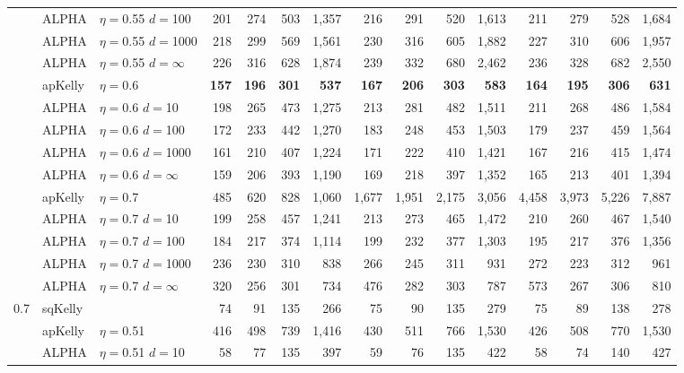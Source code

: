 \documentclass[12pt,runningheads]{llncs}
\begin{document}
{\begin{table}
\begin{tabular}{lll|rrrr|rrrr|rrrr}
& ALPHA & $\eta=$0.55 $d=$100 & 201  & 274  & 503  & 1,357  & 216  & 291  & 520  & 1,613  & 211  & 279  & 528  & 1,684  \\
& ALPHA & $\eta=$0.55 $d=$1000 & 218  & 299  & 569  & 1,561  & 230  & 316  & 605  & 1,882  & 227  & 310  & 606  & 1,957  \\
 & ALPHA & $\eta=$0.55 $d=\infty$ & 226  & 316  & 628  & 1,874  & 239  & 332  & 680  & 2,462  & 236  & 328  & 682  & 2,550  \\
\cline{2-15} & apKelly & $\eta=$0.6 & \bf{157}  & \bf{196}  & \bf{301}  & \bf{537}  & \bf{167}  & \bf{206}  & \bf{303}  & \bf{583}  & \bf{164}  & \bf{195}  & \bf{306}  & \bf{631}  \\
& ALPHA & $\eta=$0.6 $d=$10 & 198  & 265  & 473  & 1,275  & 213  & 281  & 482  & 1,511  & 211  & 268  & 486  & 1,584  \\
& ALPHA & $\eta=$0.6 $d=$100 & 172  & 233  & 442  & 1,270  & 183  & 248  & 453  & 1,503  & 179  & 237  & 459  & 1,564  \\
& ALPHA & $\eta=$0.6 $d=$1000 & 161  & 210  & 407  & 1,224  & 171  & 222  & 410  & 1,421  & 167  & 216  & 415  & 1,474  \\
 & ALPHA & $\eta=$0.6 $d=\infty$ & 159  & 206  & 393  & 1,190  & 169  & 218  & 397  & 1,352  & 165  & 213  & 401  & 1,394  \\
\cline{2-15} & apKelly & $\eta=$0.7 & 485  & 620  & 828  & 1,060  & 1,677  & 1,951  & 2,175  & 3,056  & 4,458  & 3,973  & 5,226  & 7,887  \\
& ALPHA & $\eta=$0.7 $d=$10 & 199  & 258  & 457  & 1,241  & 213  & 273  & 465  & 1,472  & 210  & 260  & 467  & 1,540  \\
& ALPHA & $\eta=$0.7 $d=$100 & 184  & 217  & 374  & 1,114  & 199  & 232  & 377  & 1,303  & 195  & 217  & 376  & 1,356  \\
& ALPHA & $\eta=$0.7 $d=$1000 & 236  & 230  & 310  & 838  & 266  & 245  & 311  & 931  & 272  & 223  & 312  & 961  \\
 & ALPHA & $\eta=$0.7 $d=\infty$ & 320  & 256  & 301  & 734  & 476  & 282  & 303  & 787  & 573  & 267  & 306  & 810  \\
\hline 0.7 & sqKelly & & 74  & 91  & 135  & 266  & 75  & 90  & 135  & 279  & 75  & 89  & 138  & 278  \\
\cline{2-15} & apKelly & $\eta=$0.51 & 416  & 498  & 739  & 1,416  & 430  & 511  & 766  & 1,530  & 426  & 508  & 770  & 1,530  \\
& ALPHA & $\eta=$0.51 $d=$10 & 58  & 77  & 135  & 397  & 59  & 76  & 135  & 422  & 58  & 74  & 140  & 427  \\

\end{tabular}
\end{table}}
\end{document}
